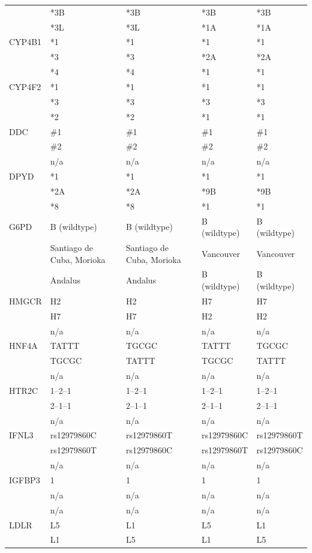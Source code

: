 \documentclass{report}
\begin{document}
\begin{tabularx}{\textwidth}{ X|XXXX }
& *3B & *3B & *3B & *3B  \\
& *3L & *3L & *1A & *1A \\
\midrule
 CYP4B1
& *1 & *1 & *1 & *1 \\
& *3 & *3 & *2A & *2A  \\
& *4 & *4 & *1 & *1 \\
\midrule
 CYP4F2
& *1 & *1 & *1 & *1 \\
& *3 & *3 & *3 & *3  \\
& *2 & *2 & *1 & *1 \\
\midrule
 DDC
& \#1 & \#1 & \#1 & \#1 \\
& \#2 & \#2 & \#2 & \#2  \\
& n/a & n/a & n/a & n/a \\
\midrule
 DPYD
& *1 & *1 & *1 & *1 \\
& *2A & *2A & *9B & *9B  \\
& *8 & *8 & *1 & *1 \\
\midrule
 G6PD
& B (wildtype) & B (wildtype) & B (wildtype) & B (wildtype) \\
& Santiago de Cuba, Morioka & Santiago de Cuba, Morioka & Vancouver & Vancouver  \\
& Andalus & Andalus & B (wildtype) & B (wildtype) \\
\midrule
 HMGCR
& H2 & H2 & H7 & H7 \\
& H7 & H7 & H2 & H2  \\
& n/a & n/a & n/a & n/a \\
\midrule
 HNF4A
& TATTT & TGCGC & TATTT & TGCGC \\
& TGCGC & TATTT & TGCGC & TATTT  \\
& n/a & n/a & n/a & n/a \\
\midrule
 HTR2C
& 1--2--1 & 1--2--1 & 1--2--1 & 1--2--1 \\
& 2--1--1 & 2--1--1 & 2--1--1 & 2--1--1  \\
& n/a & n/a & n/a & n/a \\
\midrule
 IFNL3
& rs12979860C & rs12979860T & rs12979860C & rs12979860T \\
& rs12979860T & rs12979860C & rs12979860T & rs12979860C  \\
& n/a & n/a & n/a & n/a \\
\midrule
 IGFBP3
& 1 & 1 & 1 & 1 \\
& n/a & n/a & n/a & n/a  \\
& n/a & n/a & n/a & n/a \\
\midrule
 LDLR
& L5 & L1 & L5 & L1 \\
& L1 & L5 & L1 & L5  \\

\end{tabularx}
\end{document}
